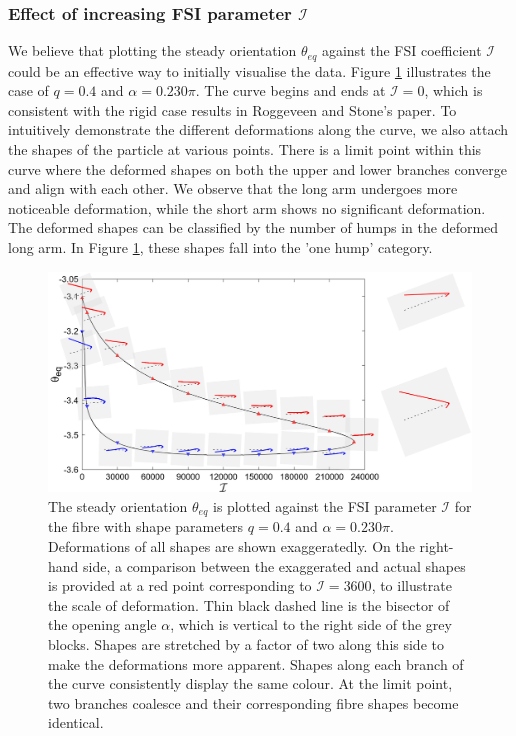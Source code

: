 \documentclass[lineno]{JFM-FLM_Au}
\begin{document}
\subsubsection{Effect of increasing FSI parameter $\mathcal{I}$}
We believe that plotting the steady orientation $\theta_{eq}$ against the FSI coefficient $\mathcal{I}$ could be an effective way to initially visualise the data. Figure \ref{fig:7} illustrates the case of $q = 0.4$ and $\alpha = 0.230\pi$. The curve begins and ends at $\mathcal{I}=0$, which is consistent with the rigid case results in Roggeveen and Stone's paper. To intuitively demonstrate the different deformations along the curve, we also attach the shapes of the particle at various points. There is a limit point within this curve where the deformed shapes on both the upper and lower branches converge and align with each other. We observe that the long arm undergoes more noticeable deformation, while the short arm shows no significant deformation. The deformed shapes can be classified by the number of humps in the deformed long arm. In Figure \ref{fig:7}, these shapes fall into the 'one hump' category.
\begin{figure}[!h]
	\begin{center}
		\includegraphics[width=1\textwidth]{plot/RESLT_q_0.40_alpha_0.230pi_plot_step_refine2_new_recale_FSI/combine_elastic_beam_I_theta_q_0.40_alpha_0.230pi_initial_-4.80_refine2_15_new.png}
		\caption{The steady orientation $\theta_{eq}$ is plotted against the FSI parameter $\mathcal{I}$ for the fibre with shape parameters $q = 0.4$ and $\alpha = 0.230\pi$. Deformations of all shapes are shown exaggeratedly. On the right-hand side, a comparison between the exaggerated and actual shapes is provided at a red point corresponding to $\mathcal{I}=3600$, to illustrate the scale of deformation. Thin black dashed line is the bisector of the opening angle $\alpha$, which is vertical to the right side of the grey blocks. Shapes are stretched by a factor of two along this side to make the deformations more apparent. Shapes along each branch of the curve consistently display the same colour. At the limit point, two branches coalesce and their corresponding fibre shapes become identical.}
		\label{fig:7}
	\end{center}
\end{figure}
\end{document}

